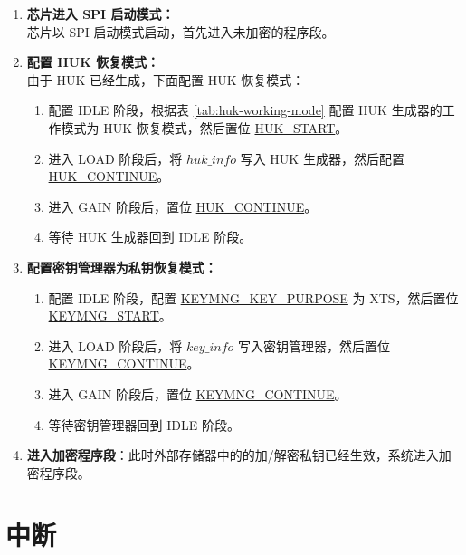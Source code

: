 \documentclass[main\_\_CN.tex]{subfiles}
\begin{document}
\begin{enumerate}
    \item \textbf{芯片进入 SPI 启动模式：}\\
    芯片以 SPI 启动模式启动，首先进入未加密的程序段。
    \item \textbf{配置 HUK 恢复模式：}\\
    由于 HUK 已经生成，下面配置 HUK 恢复模式：
    \begin{enumerate}
        \item 配置 IDLE 阶段，根据表 \ref{tab:huk-working-mode} 配置 HUK 生成器的工作模式为 HUK 恢复模式，然后置位 \hyperref[fielddesc:HUKSTART]{HUK\_START}。
        \item 进入 LOAD 阶段后，将 \hyperref[para:hukinfo]{\begin{math}huk\_info\end{math}} 写入 HUK 生成器，然后配置 \hyperref[fielddesc:HUKCONTINUE]{HUK\_CONTINUE}。
        \item 进入 GAIN 阶段后，置位 \hyperref[fielddesc:HUKCONTINUE]{HUK\_CONTINUE}。
        \item 等待 HUK 生成器回到 IDLE 阶段。
    \end{enumerate}
    \item \textbf{配置密钥管理器为私钥恢复模式：}
    \begin{enumerate}
        \item 配置 IDLE 阶段，配置  \hyperref[fielddesc:KEYMNGKEYPURPOSE]{KEYMNG\_KEY\_PURPOSE} 为 XTS，然后置位 \hyperref[fielddesc:KEYMNGSTART]{KEYMNG\_START}。
        \item 进入 LOAD 阶段后，将 \hyperref[para:keyinfo]{\begin{math}key\_info\end{math}} 写入密钥管理器，然后置位 \hyperref[fielddesc:KEYMNGCONTINUE]{KEYMNG\_CONTINUE}。
        \item 进入 GAIN 阶段后，置位 \hyperref[fielddesc:KEYMNGCONTINUE]{KEYMNG\_CONTINUE}。
        \item 等待密钥管理器回到 IDLE 阶段。
    \end{enumerate}
    \item \textbf{进入加密程序段}：此时外部存储器中的的加/解密私钥已经生效，系统进入加密程序段。
\end{enumerate}

\section{中断}
\end{document}
